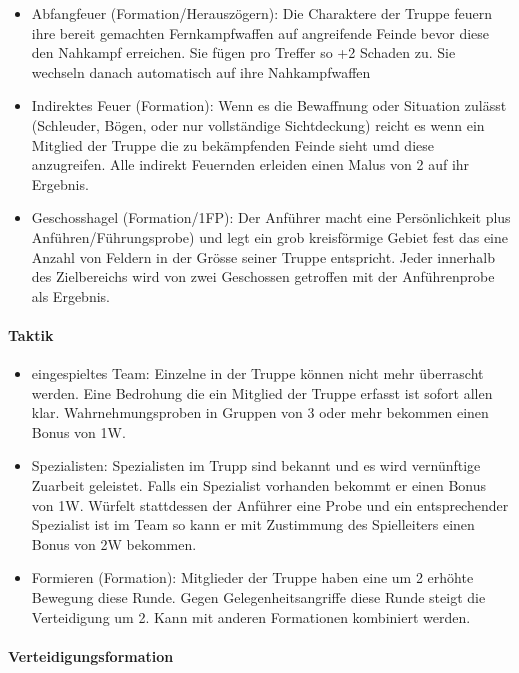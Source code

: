 \documentclass{article}
\begin{document}
\begin{itemize}
\item Abfangfeuer (Formation/Herauszögern): Die Charaktere der Truppe feuern ihre bereit gemachten Fernkampfwaffen auf angreifende Feinde bevor diese den Nahkampf erreichen. Sie fügen pro Treffer so +2 Schaden zu. Sie wechseln danach automatisch auf ihre Nahkampfwaffen
\item Indirektes Feuer (Formation): Wenn es die Bewaffnung oder Situation zulässt (Schleuder, Bögen, oder nur vollständige Sichtdeckung) reicht es wenn ein Mitglied der Truppe die zu bekämpfenden Feinde sieht umd diese anzugreifen. Alle indirekt Feuernden erleiden einen Malus von 2 auf ihr Ergebnis.
\item Geschosshagel (Formation/1FP): Der Anführer macht eine Persönlichkeit plus Anführen/Führungsprobe) und legt ein grob kreisförmige Gebiet fest das eine Anzahl von Feldern in der Grösse seiner Truppe entspricht. Jeder innerhalb des Zielbereichs wird von zwei Geschossen getroffen mit der Anführenprobe als Ergebnis.
\end{itemize}

\paragraph{Taktik}

\begin{itemize}
\item eingespieltes Team: Einzelne in der Truppe können nicht mehr überrascht werden. Eine Bedrohung die ein Mitglied der Truppe erfasst ist sofort allen klar. Wahrnehmungsproben in Gruppen von 3 oder mehr bekommen einen Bonus von 1W.
\item Spezialisten: Spezialisten im Trupp sind bekannt und es wird vernünftige Zuarbeit geleistet. Falls ein Spezialist vorhanden bekommt er einen Bonus von 1W. Würfelt stattdessen der Anführer eine Probe und ein entsprechender Spezialist ist im Team so kann er mit Zustimmung des Spielleiters einen Bonus von 2W bekommen.
\item Formieren (Formation): Mitglieder der Truppe haben eine um 2 erhöhte Bewegung diese Runde. Gegen Gelegenheitsangriffe diese Runde steigt die Verteidigung um 2. Kann mit anderen Formationen kombiniert werden.
\end{itemize}

\paragraph{Verteidigungsformation}
\end{document}
